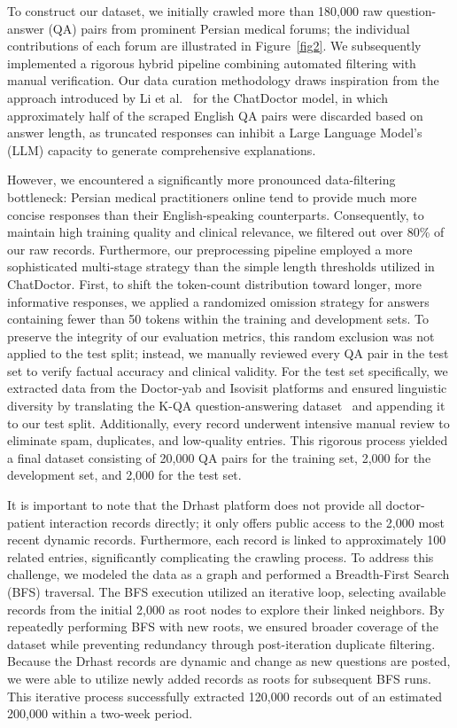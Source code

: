 \documentclass[review]{elsarticle}
\begin{document}
To construct our dataset, we initially crawled more than 180,000 raw question-answer (QA) pairs from prominent Persian medical forums; the individual contributions of each forum are illustrated in Figure~\ref{fig2}. We subsequently implemented a rigorous hybrid pipeline combining automated filtering with manual verification. Our data curation methodology draws inspiration from the approach introduced by Li et al.~\cite{b16} for the ChatDoctor model, in which approximately half of the scraped English QA pairs were discarded based on answer length, as truncated responses can inhibit a Large Language Model’s (LLM) capacity to generate comprehensive explanations.

However, we encountered a significantly more pronounced data-filtering bottleneck: Persian medical practitioners online tend to provide much more concise responses than their English-speaking counterparts. Consequently, to maintain high training quality and clinical relevance, we filtered out over 80\% of our raw records. Furthermore, our preprocessing pipeline employed a more sophisticated multi-stage strategy than the simple length thresholds utilized in ChatDoctor. First, to shift the token-count distribution toward longer, more informative responses, we applied a randomized omission strategy for answers containing fewer than 50 tokens within the training and development sets. To preserve the integrity of our evaluation metrics, this random exclusion was not applied to the test split; instead, we manually reviewed every QA pair in the test set to verify factual accuracy and clinical validity. For the test set specifically, we extracted data from the Doctor-yab and Isovisit platforms and ensured linguistic diversity by translating the K-QA question-answering dataset~\cite{b23} and appending it to our test split. Additionally, every record underwent intensive manual review to eliminate spam, duplicates, and low-quality entries. This rigorous process yielded a final dataset consisting of 20,000 QA pairs for the training set, 2,000 for the development set, and 2,000 for the test set.

It is important to note that the Drhast platform does not provide all doctor-patient interaction records directly; it only offers public access to the 2,000 most recent dynamic records. Furthermore, each record is linked to approximately 100 related entries, significantly complicating the crawling process. To address this challenge, we modeled the data as a graph and performed a Breadth-First Search (BFS) traversal. The BFS execution utilized an iterative loop, selecting available records from the initial 2,000 as root nodes to explore their linked neighbors. By repeatedly performing BFS with new roots, we ensured broader coverage of the dataset while preventing redundancy through post-iteration duplicate filtering. Because the Drhast records are dynamic and change as new questions are posted, we were able to utilize newly added records as roots for subsequent BFS runs. This iterative process successfully extracted 120,000 records out of an estimated 200,000 within a two-week period.
\end{document}
